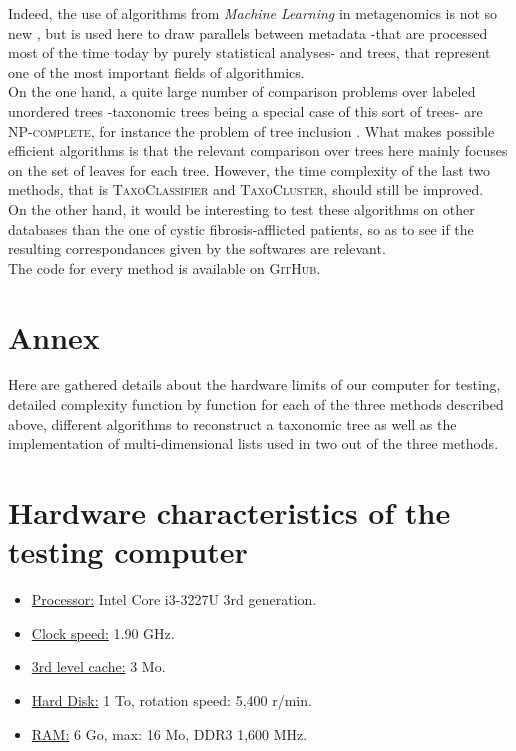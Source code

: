 \documentclass{report}
\begin{document}
Indeed, the use of algorithms from \emph{Machine Learning} in metagenomics is not so new \cite{Nikolski}, but is used here to draw parallels between metadata -that are processed most of the time today by purely statistical analyses- and trees, that represent one of the most important fields of algorithmics.\\

On the one hand, a quite large number of comparison problems over labeled unordered trees -taxonomic trees being a special case of this sort of trees- are \textsc{NP-complete}, for instance the problem of tree inclusion \cite{TreeInclusion}. What makes possible efficient algorithms is that the relevant comparison over trees here mainly focuses on the set of leaves for each tree. However, the time complexity of the last two methods, that is \textsc{TaxoClassifier} and \textsc{TaxoCluster}, should still be improved.\\

On the other hand, it would be interesting to test these algorithms on other databases than the one of cystic fibrosis-afflicted patients, so as to see if the resulting correspondances given by the softwares are relevant.\\

The code for every method is available on \textsc{GitHub}.\\

\newpage




\newpage

\appendix

\chapter*{Annex}

Here are gathered details about the hardware limits of our computer for testing, detailed complexity function by function for each of the three methods described above, different algorithms to reconstruct a taxonomic tree as well as the implementation of multi-dimensional lists used in two out of the three methods.

\chapter{Hardware characteristics of the testing computer}

\begin{itemize}
\item \uline{Processor:} Intel Core i3-3227U 3rd generation.
\item \uline{Clock speed:} 1.90 GHz.
\item \uline{3rd level cache:} 3 Mo.
\item \uline{Hard Disk:} 1 To, rotation speed: 5,400 r/min.
\item \uline{RAM:} 6 Go, max: 16 Mo, DDR3 1,600 MHz.
\end{itemize}
\end{document}
